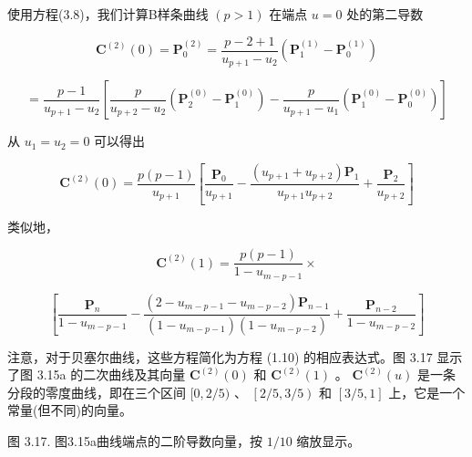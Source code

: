 \documentclass[../main.tex]{subfiles}
\begin{document}
使用方程(3.8)，我们计算B样条曲线 \(\left( {p > 1}\right)\) 在端点 \(u = 0\) 处的第二导数

\[
{\mathbf{C}}^{\left( 2\right) }\left( 0\right)  = {\mathbf{P}}_{0}^{\left( 2\right) } = \frac{p - 2 + 1}{{u}_{p + 1} - {u}_{2}}\left( {{\mathbf{P}}_{1}^{\left( 1\right) } - {\mathbf{P}}_{0}^{\left( 1\right) }}\right)
\]

\[
= \frac{p - 1}{{u}_{p + 1} - {u}_{2}}\left\lbrack  {\frac{p}{{u}_{p + 2} - {u}_{2}}\left( {{\mathbf{P}}_{2}^{\left( 0\right) } - {\mathbf{P}}_{1}^{\left( 0\right) }}\right)  - \frac{p}{{u}_{p + 1} - {u}_{1}}\left( {{\mathbf{P}}_{1}^{\left( 0\right) } - {\mathbf{P}}_{0}^{\left( 0\right) }}\right) }\right\rbrack
\]

从 \({u}_{1} = {u}_{2} = 0\) 可以得出

\[
{\mathbf{C}}^{\left( 2\right) }\left( 0\right)  = \frac{p\left( {p - 1}\right) }{{u}_{p + 1}}\left\lbrack  {\frac{{\mathbf{P}}_{0}}{{u}_{p + 1}} - \frac{\left( {{u}_{p + 1} + {u}_{p + 2}}\right) {\mathbf{P}}_{1}}{{u}_{p + 1}{u}_{p + 2}} + \frac{{\mathbf{P}}_{2}}{{u}_{p + 2}}}\right\rbrack   \tag{3.9}
\]

类似地，

\[
{\mathbf{C}}^{\left( 2\right) }\left( 1\right)  = \frac{p\left( {p - 1}\right) }{1 - {u}_{m - p - 1}} \times
\]

\[
\left\lbrack  {\frac{{\mathbf{P}}_{n}}{1 - {u}_{m - p - 1}} - \frac{\left( {2 - {u}_{m - p - 1} - {u}_{m - p - 2}}\right) {\mathbf{P}}_{n - 1}}{\left( {1 - {u}_{m - p - 1}}\right) \left( {1 - {u}_{m - p - 2}}\right) } + \frac{{\mathbf{P}}_{n - 2}}{1 - {u}_{m - p - 2}}}\right\rbrack   \tag{3.10}
\]

注意，对于贝塞尔曲线，这些方程简化为方程 (1.10) 的相应表达式。图 3.17 显示了图 3.15a 的二次曲线及其向量 \({\mathbf{C}}^{\left( 2\right) }\left( 0\right)\) 和 \({\mathbf{C}}^{\left( 2\right) }\left( 1\right)\) 。 \({\mathbf{C}}^{\left( 2\right) }\left( u\right)\) 是一条分段的零度曲线，即在三个区间 \(\lbrack 0,2/5)\) 、 \(\left\lbrack  {2/5,3/5}\right)\) 和 \(\left\lbrack  {3/5,1}\right\rbrack\) 上，它是一个常量(但不同)的向量。

\begin{center}
\begin{minipage}{16cm}
\vspace*{.6\baselineskip}
\centering
{}
\par\smallskip
图 3.17. 图3.15a曲线端点的二阶导数向量，按 \(1/10\) 缩放显示。
\end{minipage}
\end{center}
\end{document}
